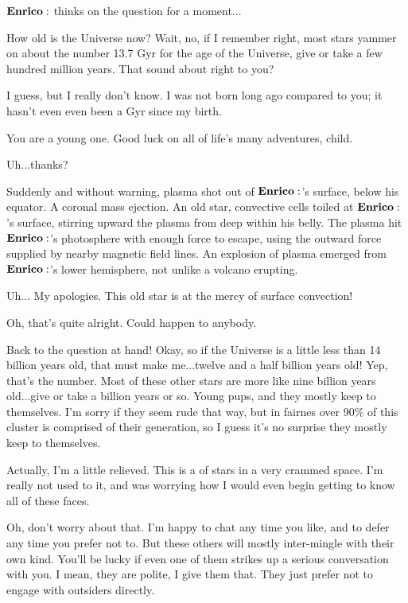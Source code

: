 $\Enrico$ thinks on the question for a moment...

\Enrico How old is the Universe now?  Wait, no, if I remember right, most stars yammer on about the number 13.7 Gyr for the age of the Universe, give or take a few hundred million years.  That sound about right to you?

\Sterope I guess, but I really don't know.  I was not born long ago compared to you; it hasn't even even been a Gyr since my birth.

\Enrico You are a young one.  Good luck on all of life's many adventures, child.  

\Sterope Uh...thanks?

Suddenly and without warning, plasma shot out of $\Enrico$'s surface, below his equator.  A coronal mass ejection.  An old star, convective cells toiled at $\Enrico$'s surface, stirring upward the plasma from deep within his belly.  The plasma hit $\Enrico$'s photosphere with enough force to escape, using the outward force supplied by nearby magnetic field lines.  An explosion of plasma emerged from $\Enrico$'s lower hemisphere, not unlike a volcano erupting.

\Enrico Uh... My apologies.  This old star is at the mercy of surface convection!

\Sterope Oh, that's quite alright.  Could happen to anybody.

\Enrico Back to the question at hand!  Okay, so if the Universe is a little less than 14 billion years old, that must make me...twelve and a half billion years old!  Yep, that's the number.  Most of these other stars are more like nine billion years old...give or take a billion years or so.  Young pups, and they mostly keep to themselves.  I'm sorry if they seem rude that way, but in fairnes over 90\% of this cluster is comprised of their generation, so I guess it's no surprise they mostly keep to themselves.  

\Sterope Actually, I'm a little relieved.  This is a  of stars in a very crammed space.  I'm really not used to it, and was worrying how I would even begin getting to know all of these faces.

\Enrico Oh, don't worry about that.  I'm happy to chat any time you like, and to defer any time you prefer not to.  But these others will mostly inter-mingle with their own kind.  You'll be lucky if even one of them strikes up a serious conversation with you.  I mean, they are polite, I give them that.  They just prefer not to engage with outsiders directly.  

